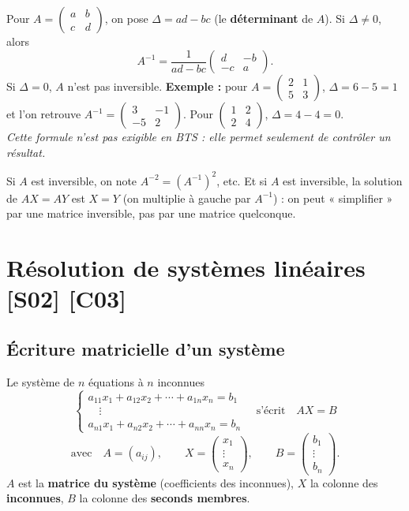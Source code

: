 \documentclass[a4paper,11pt]{article}
\newcommand{\M}[1]{\begin{pmatrix}#1\end{pmatrix}}
\begin{document}
\begin{horsprog}\label{hp:formule}
Pour $A=\M{a & b\\ c & d}$, on pose $\Delta = ad - bc$ (le \textbf{déterminant} de $A$). Si $\Delta\neq 0$, alors
\[
A^{-1} = \frac{1}{ad-bc}\M{d & -b\\ -c & a}.
\]
Si $\Delta = 0$, $A$ n'est pas inversible. \textbf{Exemple :} pour $A=\M{2 & 1\\ 5 & 3}$, $\Delta = 6-5 = 1$ et l'on retrouve $A^{-1}=\M{3 & -1\\ -5 & 2}$. Pour $\M{1 & 2\\ 2 & 4}$, $\Delta = 4 - 4 = 0$.\\
\textit{Cette formule n'est pas exigible en BTS : elle permet seulement de contrôler un résultat.}
\end{horsprog}

\begin{remarque}
Si $A$ est inversible, on note $A^{-2} = (A^{-1})^2$, etc. Et si $A$ est inversible, la solution de $AX = AY$ est $X = Y$ (on multiplie à gauche par $A^{-1}$) : on peut « simplifier » par une matrice inversible, pas par une matrice quelconque.
\end{remarque}

\needspace{7cm}
\section{Résolution de systèmes linéaires \hfill {\normalsize\color{uimmred}[S02] [C03]}}\label{sec:systemes}

\subsection{Écriture matricielle d'un système}\label{subsec:ecriture}

\begin{definition}[-- Forme matricielle $AX=B$]
Le système de $n$ équations à $n$ inconnues
\[
\left\{\begin{array}{l}
a_{11}x_1 + a_{12}x_2 + \cdots + a_{1n}x_n = b_1\\
\quad\vdots\\
a_{n1}x_1 + a_{n2}x_2 + \cdots + a_{nn}x_n = b_n
\end{array}\right.
\quad\text{s'écrit}\quad
AX = B
\]
\[
\text{avec}\quad
A = (a_{ij}),\qquad X=\M{x_1\\ \vdots\\ x_n},\qquad B=\M{b_1\\ \vdots\\ b_n}.
\]
$A$ est la \textbf{matrice du système} (coefficients des inconnues), $X$ la colonne des \textbf{inconnues}, $B$ la colonne des \textbf{seconds membres}.
\end{definition}
\end{document}
